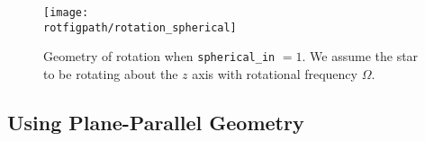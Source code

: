 \begin{figure}[tpb]
\hspace{-0.25in}
\centering
\texttt{[image: \\rotfigpath/rotation\_spherical]}
\begin{minipage}[h]{2.0in}
\vspace{-4in}
\caption{Geometry of rotation when {\tt spherical\_in} $=1$.  We assume the 
star to be rotating about the $z$ axis with rotational frequency $\Omega$.}
\end{minipage}
\label{Fig:rotation in spherical}
\end{figure}

\subsection{Using Plane-Parallel Geometry}\label{Sec:Using Plane-Parallel Geometry}
